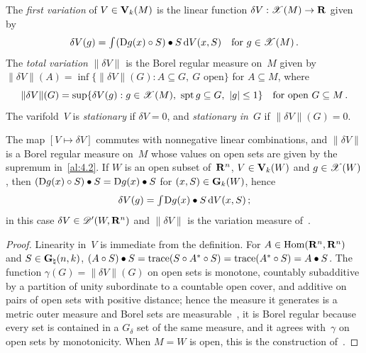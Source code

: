 \begin{definition}
    \label{al:4.2}
    The \emph{first variation} of $V \in \mathbf{V}_{k}(M)$ is the linear function $\delta V :
    \mathscr{X}(M) \to \mathbf{R}$ given by
    \begin{displaymath}
        \delta V(g) = {\textstyle\int_{}^{}} (\mathrm{D} g(x) \circ S) \bullet S \,\mathrm{d} V(x,S) \quad \text{for $g \in
        \mathscr{X}(M)$} \,.
    \end{displaymath}
    The \emph{total variation} $\|\delta V\|$ is the Borel regular measure on~$M$ given by
    $\|\delta V\|(A) = \inf \{ \|\delta V\|(G) : A \subseteq G,\ G \text{ open} \}$ for $A
    \subseteq M$, where
    \begin{displaymath}
        \|\delta V\|(G) = \sup \{ \delta V(g) : g \in \mathscr{X}(M),\ \operatorname{spt} g \subseteq G,\ |g| \le 1 \}
        \quad \text{for open $G \subseteq M$} \,.
    \end{displaymath}
    The varifold~$V$ is \emph{stationary} if $\delta V = 0$, and \emph{stationary in}~$G$ if
    $\|\delta V\|(G) = 0$.
\end{definition}

\begin{lemma}
    \label{al:4.2:lem}
    The map $[V \mapsto \delta V]$ commutes with nonnegative linear combinations, and $\|\delta
    V\|$ is a Borel regular measure on~$M$ whose values on open sets are given by the supremum
    in~\ref{al:4.2}. If $W$ is an open subset of~$\mathbf{R}^{n}$, $V \in \mathbf{V}_{k}(W)$ and $g \in
    \mathscr{X}(W)$, then $(\mathrm{D} g(x) \circ S) \bullet S = \mathrm{D} g(x) \bullet S$ for $(x,S) \in \mathbf{G}_{k}(W)$, hence
    \begin{displaymath}
        \delta V(g) = {\textstyle\int_{}^{}} \mathrm{D} g(x) \bullet S \,\mathrm{d} V(x,S) \,;
    \end{displaymath}
    in this case $\delta V \in \mathscr{D}'(W,\mathbf{R}^{n})$ and $\|\delta V\|$ is the variation measure
    of~\cite[4.1.5]{Federer1969}.
\end{lemma}

\begin{proof}
    Linearity in~$V$ is immediate from the definition. For $A \in \operatorname{Hom}(\mathbf{R}^{n},\mathbf{R}^{n})$
    and $S \in \mathbf{G}_{\natural}(n,k)$, $(A \circ S) \bullet S = \operatorname{trace}(S \circ A^{*}
    \circ S) = \operatorname{trace}(A^{*} \circ S) = A \bullet S$. The function $\gamma(G) = \|\delta
    V\|(G)$ on open sets is monotone, countably subadditive by a partition of unity
    subordinate to a countable open cover, and additive on pairs of open sets with positive
    distance; hence the measure it generates is a metric outer measure and Borel sets are
    measurable~\cite[2.3.2(9)]{Federer1969}, it is Borel regular because every set is contained in
    a $G_\delta$ set of the same measure, and it agrees with~$\gamma$ on open sets by
    monotonicity. When $M = W$ is open, this is the construction of~\cite[4.1.5]{Federer1969}.
\end{proof}


